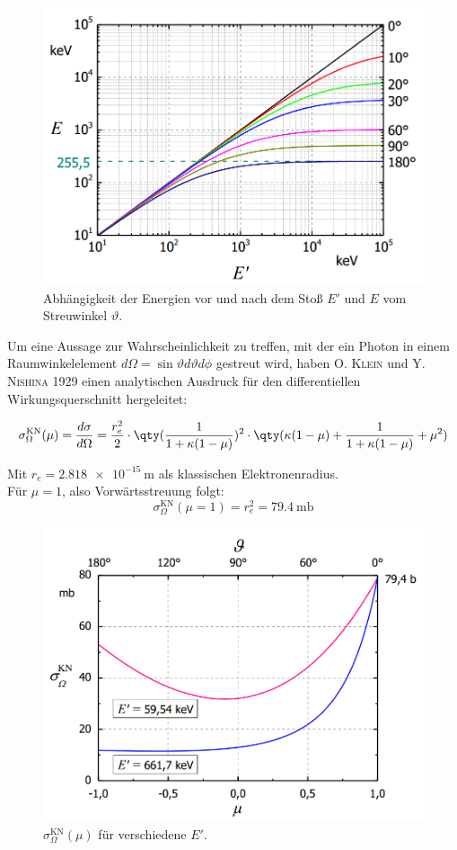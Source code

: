 \documentclass[slug=CS, room=Andreas-Schubert-Bau\,\ Labor\ 406,
supervisor=Juliane\ Volkmer, coursedate=29.\ 11.\ 2019]{../../Lab_Report_LaTeX/lab_report}
\begin{document}
\begin{figure}[H]\centering
	\includegraphics[width=.5\columnwidth]{./pictures/evontheta.png}
	\caption{Abhängigkeit der Energien vor und nach dem Stoß \(E'\) und \(E\) vom Streuwinkel
	\(\vartheta\).}
	\label{fig:evontheta}
\end{figure}

Um eine Aussage zur Wahrscheinlichkeit zu treffen, mit der ein Photon in einem Raumwinkelelement
\(d\Omega = \sin\vartheta d\vartheta d\phi\) gestreut wird, haben \textsc{O. Klein} und
\textsc{Y. Nishina} 1929 einen analytischen Ausdruck für den differentiellen Wirkungsquerschnitt
hergeleitet:

\begin{equation}\label{eq:kn}
	\sigma^{\text{KN}}_\Omega(\mu) = \frac{d\sigma}{d\Omega} = \frac{r_e^2}{2} \cdot \qty(\frac{1}{1 + \kappa(1 - \mu)})^2 \cdot \qty(\kappa(1 - \mu) + \frac{1}{1 + \kappa(1 - \mu)} + \mu^2)
\end{equation}

Mit \(r_e = \SI{2,818e-15}{\metre}\) als klassischen Elektronenradius.\\

Für \(\mu = 1\), also Vorwärtsstreuung folgt:
\begin{equation}\label{key}
	\sigma^{\text{KN}}_\Omega(\mu = 1) = r_e^2 = \SI{79,4}{\milli\barn}
\end{equation}

\begin{figure}[H]\centering
	\includegraphics[width=.5\columnwidth]{./pictures/sigma_kn.png}
	\caption{\(\sigma^{\text{KN}}_\Omega(\mu)\) für verschiedene \(E'\).}
	\label{fig:sigmakn}
\end{figure}
\end{document}

